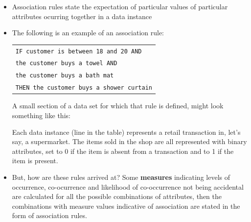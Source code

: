 \begin{itemize}
\item Association rules state the expectation of particular values of particular attributes ocurring together in a data instance
\item The following is an example of an association rule:

  \begin{tabular}{l}
    \texttt{IF customer is between 18 and 20 AND} \\
    \texttt{the customer buys a towel AND} \\
    \texttt{the customer buys a bath mat} \\
    \texttt{THEN the customer buys a shower curtain} \\
   \end{tabular}

 A small section of a data set for which that rule is defined, might look something like this: 

 \oneex
    \oneex
    
    Each data instance (line in the table) represents a retail transaction in, let's say, a supermarket. The items sold in the shop are all represented with binary attributes, set to 0 if the item is absent from a transaction and to 1 if the item is present.
\newpage

\item But, how are these rules arrived at? Some \textbf{measures} indicating levels of occurrence, co-ocurrence and likelihood of co-occurrence not being accidental are calculated for all the possible combinations of attributes, then the combinations with measure values indicative of association are stated in the form of association rules.


\end{itemize}
